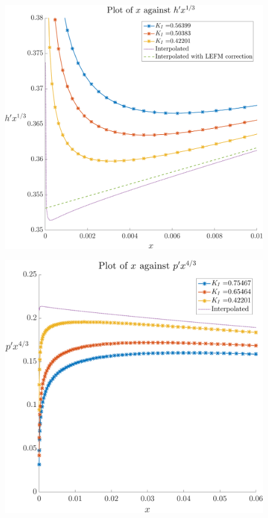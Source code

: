 \documentclass{article}
\begin{document}
\begin{figure}[!ht]\centering
\includegraphics[scale=0.3]{hprime-x.pdf}
\end{figure}
\begin{figure}[!ht]\centering
\includegraphics[scale=0.3]{pprime-x.pdf}
\end{figure}
\end{document}
